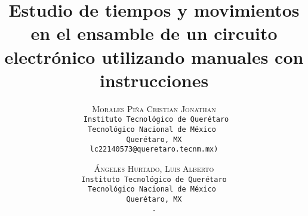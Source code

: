      
     \lfoot{ \thepage}
     
     \setlength{\droptitle}{-5\baselineskip} %
     \title{\textbf{Estudio de tiempos y movimientos en el ensamble de un circuito electrónico utilizando manuales con instrucciones}} %
     
      \author{ 
      \textsc{Morales Piña  Cristian Jonathan}\\ 
      \texttt{ Instituto Tecnológico de Querétaro} \\ 
      \texttt{Tecnológico Nacional de México  } \\ 
      \texttt{Querétaro, MX}\\ 
      \texttt{lc22140573@queretaro.tecnm.mx)} 
      \and 
      \textsc{Ángeles Hurtado, Luis Alberto}\\ 
      \texttt{ Instituto Tecnológico de Querétaro } \\ 
      \texttt{Tecnológico Nacional de México } \\ 
      \texttt{Querétaro, MX}\\ 
      \texttt{.} 
     }
     
     
     
     
     \maketitle
     \thispagestyle{fancy}
     
